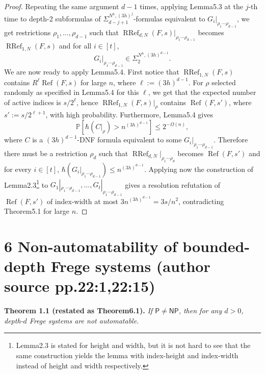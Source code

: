 \documentclass[10pt,a4paper]{article}
\newcommand{\RRef}{\operatorname{RRef}}
\renewcommand{\Ref}{\operatorname{Ref}}
\newenvironment{originalresult}[1]{\par\medskip\noindent\textbf{#1.}\itshape}{\par\medskip}
\begin{document}
\begin{proof}
Repeating the same argument $d-1$ times, applying Lemma5.3 at the $j$-th time to depth-2 subformulas of $\Sigma_{d-j+1}^{N^h,(3h)^j}$-formulas equivalent to $G_i|_{\rho_1\cdots\rho_{d-1}}$, we get restrictions $\rho_1,\ldots,\rho_{d-1}$ such that $\RRef_{d,N}(F,s)|_{\rho_1\cdots\rho_{d-1}}$ becomes $\RRef_{1,N}(F,s)$ and for all $i\in[t]$,
\[G_i|_{\rho_1\cdots\rho_{d-1}}\in\Sigma_2^{N^h,(3h)^{d-1}}.\]
We are now ready to apply Lemma5.4. First notice that $\RRef_{1,N}(F,s)$ contains $R^\ell\Ref(F,s)$ for large $n$, where $\ell:=(3h)^{d-1}$. For $\rho$ selected randomly as specified in Lemma5.4 for this $\ell$, we get that the expected number of active indices is $s/2^\ell$, hence $\RRef_{1,N}(F,s)|_\rho$ contains $\Ref(F,s')$, where $s':=s/2^{\ell+1}$, with high probability. Furthermore, Lemma5.4 gives
\[\mathbb P[\hbar(C|_\rho)>n^{(3h)^{d-1}}]\le2^{-\Omega(n)},\]
where $C$ is a $(3h)^{d-1}$-DNF formula equivalent to some $G_i|_{\rho_1\cdots\rho_{d-1}}$. Therefore there must be a restriction $\rho_d$ such that $\RRef_{d,N}|_{\rho_1\cdots\rho_d}$ becomes $\Ref(F,s')$ and for every $i\in[t]$, $\hbar(G_i|_{\rho_1\cdots\rho_{d-1}})\le n^{(3h)^{d-1}}$. Applying now the construction of Lemma2.3\footnote{Lemma2.3 is stated for height and width, but it is not hard to see that the same construction yields the lemma with index-height and index-width instead of height and width respectively.} to $G_1|_{\rho_1\cdots\rho_{d-1}},\ldots,G_t|_{\rho_1\cdots\rho_{d-1}}$ gives a resolution refutation of $\Ref(F,s')$ of index-width at most $3n^{(3h)^{d-1}}=3s/n^2$, contradicting Theorem5.1 for large $n$.
\end{proof}

\section*{6 Non-automatability of bounded-depth Frege systems (author source pp.22:1,22:15)}
\begin{originalresult}{Theorem 1.1 (restated as Theorem6.1)}
If $\mathsf P\ne\mathsf{NP}$, then for any $d>0$, depth-$d$ Frege systems are not automatable.
\end{originalresult}
\end{document}
